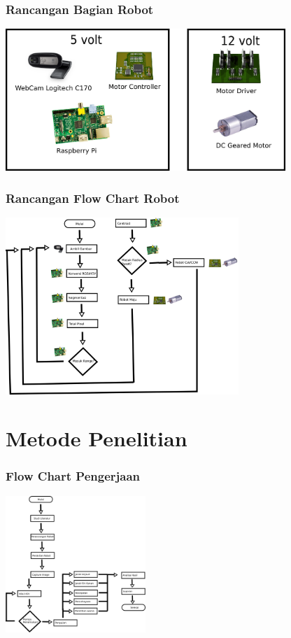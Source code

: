 \documentclass[table,dvipsnames]{beamer}
\begin{document}
\begin{frame}
 \frametitle{Rancangan Bagian Robot}
 \begin{center}
 \includegraphics[width=300pt]{./bagian_robot/parts.png}
\end{center}
\end{frame}

\begin{frame}
\frametitle{Rancangan Flow Chart Robot}
\begin{center}
 \includegraphics[width=250pt]{./proses_robot/process}
\end{center}
\end{frame}


\section{Metode Penelitian}

\begin{frame}
\frametitle{Flow Chart Pengerjaan}
\begin{center}
 \includegraphics[width=150pt]{./pengerjaan/work}
\end{center}
\end{frame}
\end{document}
